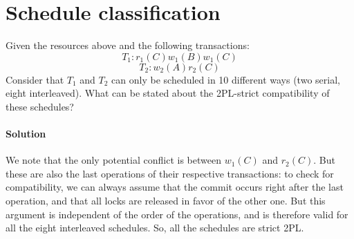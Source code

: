 \section{Schedule classification}

Given the resources above and the following transactions:
\[T_1: r_1(C) w_1(B) w_1(C)\] 
\[T_2: w_2(A) r_2(C)\]
Consider that $T_1$ and $T_2$ can only be scheduled in 10 different ways (two serial, eight interleaved). What can be stated about 
the 2PL-strict compatibility of these schedules? 

\paragraph*{Solution}
We note that the only potential conflict is between $w_1(C)$ and $r_2(C)$.
But these are also the last operations of their respective transactions: to check for compatibility, we can always assume that the commit occurs right after the last operation, and that all locks are released in favor of the other one. 
But this argument is independent of the order of the operations, and is therefore valid for all the eight interleaved schedules. So, all the schedules are strict 2PL. 